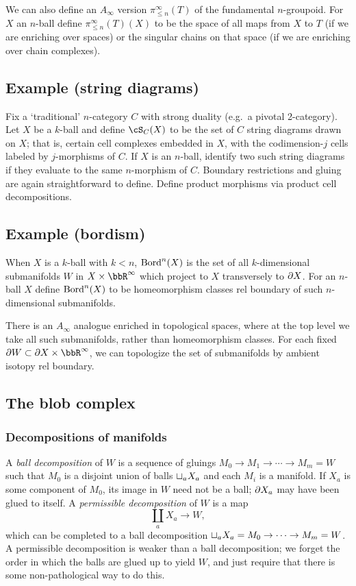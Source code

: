\documentclass{pnastwo}
\begin{document}
\begin{article}
We can also define an $A_\infty$ version $\pi_{\le n}^\infty(T)$ of the fundamental $n$-groupoid.
For $X$ an $n$-ball define $\pi_{\le n}^\infty(T)(X)$ to be the space of all maps from $X$ to $T$
(if we are enriching over spaces) or the singular chains on that space (if we are enriching over chain complexes).


\subsection{Example (string diagrams)}
Fix a `traditional' $n$-category $C$ with strong duality (e.g.\ a pivotal 2-category).
Let $X$ be a $k$-ball and define $\cS_C(X)$ to be the set of $C$ string diagrams drawn on $X$;
that is, certain cell complexes embedded in $X$, with the codimension-$j$ cells labeled by $j$-morphisms of $C$.
If $X$ is an $n$-ball, identify two such string diagrams if they evaluate to the same $n$-morphism of $C$.
Boundary restrictions and gluing are again straightforward to define.
Define product morphisms via product cell decompositions.

\subsection{Example (bordism)}
When $X$ is a $k$-ball with $k<n$, $\operatorname{Bord}^n(X)$ is the set of all $k$-dimensional
submanifolds $W$ in $X\times \bbR^\infty$ which project to $X$ transversely
to $\partial X$.
For an $n$-ball $X$ define $\operatorname{Bord}^n(X)$ to be homeomorphism classes rel boundary of such $n$-dimensional submanifolds.

There is an $A_\infty$ analogue enriched in topological spaces, where at the top level we take all such submanifolds, rather than homeomorphism classes. For each fixed $\bdy W \subset \bdy X \times \bbR^\infty$, we can topologize the set of submanifolds by ambient isotopy rel boundary.

\subsection{The blob complex}
\subsubsection{Decompositions of manifolds}

A \emph{ball decomposition} of $W$ is a 
sequence of gluings $M_0\to M_1\to\cdots\to M_m = W$ such that $M_0$ is a disjoint union of balls
$\sqcup_a X_a$ and each $M_i$ is a manifold.
If $X_a$ is some component of $M_0$, its image in $W$ need not be a ball; $\partial X_a$ may have been glued to itself.
A {\it permissible decomposition} of $W$ is a map
\[
	\coprod_a X_a \to W,
\]
which can be completed to a ball decomposition $\sqcup_a X_a = M_0\to\cdots\to M_m = W$.
A permissible decomposition is weaker than a ball decomposition; we forget the order in which the balls
are glued up to yield $W$, and just require that there is some non-pathological way to do this.


\end{article}
\end{document}
